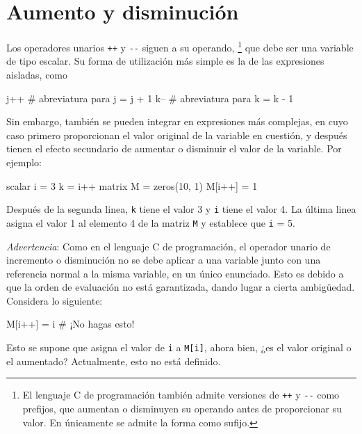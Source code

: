 \section{Aumento y disminución}

Los operadores unarios \texttt{++} y \verb|--| siguen a su operando,
\footnote{El lenguaje C de programación también admite versiones de \texttt{++}
  y \verb|--| como prefijos, que aumentan o disminuyen su operando
  antes de proporcionar su valor. En  únicamente se admite
  la forma como sufijo.}  que debe ser una variable de tipo escalar.
Su forma de utilización más simple es la de las expresiones aisladas, como
%
\begin{code}
j++  # abreviatura para j = j + 1
k--  # abreviatura para k = k - 1
\end{code}
%
Sin embargo, también se pueden integrar en expresiones más complejas,
en cuyo caso primero proporcionan el valor original de la variable en
cuestión, y después tienen el efecto secundario de aumentar o disminuir
el valor de la variable. Por ejemplo:
%
\begin{code}
scalar i = 3
k = i++
matrix M = zeros(10, 1)
M[i++] = 1
\end{code}
%
Después de la segunda linea, \texttt{k} tiene el valor 3 y \texttt{i}
tiene el valor 4. La última linea asigna el valor 1 al elemento 4 de la
matriz \texttt{M} y establece que \texttt{i} = 5.

\textit{Advertencia}: Como en el lenguaje C de programación, el operador
unario de incremento o disminución no se debe aplicar a una variable
junto con una referencia normal a la misma variable, en un único enunciado.
Esto es debido a que la orden de evaluación no está garantizada, dando
lugar a cierta ambigüedad. Considera lo siguiente:
%
\begin{code}
M[i++] = i # ¡No hagas esto!
\end{code}
%
Esto se supone que asigna el valor de \texttt{i} a \texttt{M[i]}, ahora
bien, ¿es el valor original o el aumentado? Actualmente, esto no está
definido.
